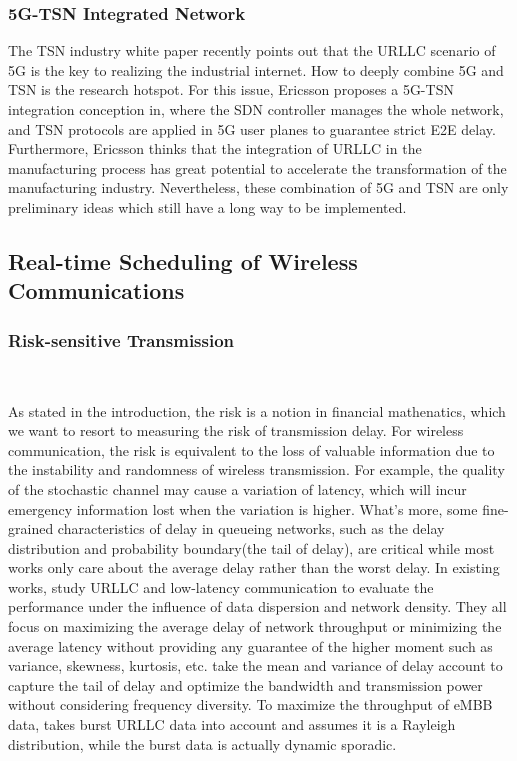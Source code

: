 \documentclass{SCIS2021}
\begin{document}
	\subsubsection{5G-TSN Integrated Network}
	The TSN industry white paper recently points out that the URLLC scenario of 5G is the key to realizing the industrial internet. How to deeply combine 5G and TSN is the research hotspot. For this issue, Ericsson proposes a 5G-TSN integration conception in\cite{farkas20195g}, where the SDN controller manages the whole network, and TSN protocols are applied in 5G user planes to guarantee strict E2E delay. Furthermore, Ericsson thinks that the integration of URLLC in the manufacturing process has great potential to accelerate the transformation of the manufacturing industry\cite{sachs2019boosting}. Nevertheless, these combination of 5G and TSN are only preliminary ideas which still have a long way to be implemented.
	
	\subsection{Real-time Scheduling of Wireless Communications}
	
	\subsubsection{Risk-sensitive Transmission}~{}
	
	As stated in the introduction, the risk is a notion in financial mathenatics\cite{follmer2004stochastic}, which we want to resort to measuring the risk of transmission delay. For wireless communication, the risk is equivalent to the loss of valuable information due to the instability and randomness of wireless transmission. For example, the quality of the stochastic channel may cause a variation of latency, which will incur emergency information lost when the variation is higher\cite{batewela2019risk}. What's more, some fine-grained characteristics of delay in queueing networks, such as the delay distribution and probability boundary(the tail of delay), are critical while most works only care about the average delay rather than the worst delay\cite{bennis2018ultrareliable}. In existing works, \cite{yang2018low,vu2018path} study URLLC and low-latency communication to evaluate the performance under the influence of data dispersion and network density. They all focus on maximizing the average delay of network throughput or minimizing the average latency without providing any guarantee of the higher moment such as variance, skewness, kurtosis, etc. \cite{vu2017ultra}\cite{assaad2011risk} take the mean and variance of delay account to capture the tail of delay and optimize the bandwidth and transmission power without considering frequency diversity. To maximize the throughput of eMBB data, \cite{alsenwi2019embb} takes burst URLLC data into account and assumes it is a Rayleigh distribution, while the burst data is actually dynamic sporadic.
	
\end{document}
